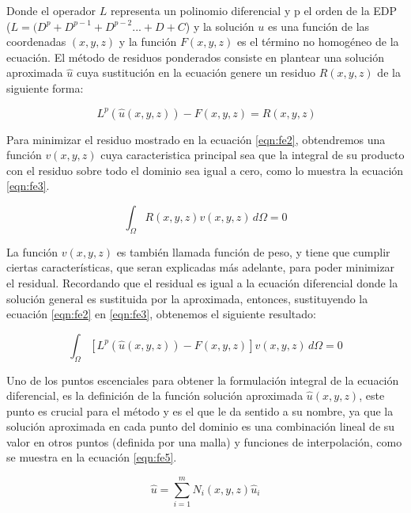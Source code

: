 Donde el operador $L$ representa un polinomio diferencial y p el orden de la EDP ($L=(D^{p}+D^{p-1}+D^{p-2}...+D+C$) y la solución $u$ es una función de las coordenadas $(x,y,z)$ y la función $F(x,y,z)$ es el término no homogéneo de la ecuación. El método de residuos ponderados consiste en plantear una solución aproximada $\hat{u}$ cuya sustitución en la ecuación genere un residuo $R(x,y,z)$ de la siguiente forma: 

\begin{equation}
\label{eqn:fe2}
 \ L^{p}(\hat{u}(x,y,z))-F(x,y,z)=R(x,y,z)
\end{equation}

Para minimizar el residuo mostrado en la ecuación \ref{eqn:fe2}, obtendremos una función $v(x,y,z)$ cuya caracteristica principal sea que la integral de su producto con el residuo sobre todo el dominio sea igual a cero, como lo muestra la ecuación \ref{eqn:fe3}. 

\begin{equation}
\label{eqn:fe3}
  \displaystyle\int_{\Omega}^{} R(x,y,z)v(x,y,z)\, d\Omega = 0
\end{equation}

La función $v(x,y,z)$ es también llamada función de peso, y tiene que cumplir ciertas características, que seran explicadas más adelante, para poder minimizar el residual. Recordando que el residual es igual a la ecuación diferencial donde la solución general es sustituida por la aproximada, entonces, sustituyendo la ecuación \ref{eqn:fe2} en \ref{eqn:fe3}, obtenemos el siguiente resultado:

\begin{equation}
\label{eqn:fe4}
  \displaystyle\int_{\Omega}^{} [L^{p}(\hat{u}(x,y,z))-F(x,y,z)] v(x,y,z)\, d\Omega = 0      
\end{equation}

Uno de los puntos escenciales para obtener la formulación integral de la ecuación diferencial, es la definición de la función solución aproximada $\hat{u}(x,y,z)$, este punto es crucial para el método y es el que le da sentido a su nombre, ya que la solución aproximada en cada punto del dominio es una combinación lineal de su valor en otros puntos (definida por una malla) y funciones de interpolación, como se muestra en la ecuación \ref{eqn:fe5}.

\begin{equation}
\label{eqn:fe5}
    \hat{u}=\displaystyle\sum_{i=1}^m  N_{i}(x,y,z){\hat{u}_{i}}        
\end{equation}

